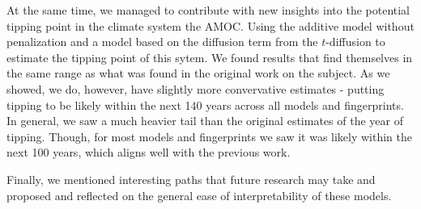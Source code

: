 At the same time, we managed to contribute with new insights into the potential tipping point in the climate system the AMOC. Using the additive model without penalization and a model based on the diffusion term from the $t$-diffusion to estimate the tipping point of this sytem. We found results that find themselves in the same range as what was found in the original work on the subject. As we showed, we do, however, have slightly more convervative estimates - putting tipping to be likely within the next 140 years across all models and fingerprints. In general, we saw a much heavier tail than the original estimates of the year of tipping. Though, for most models and fingerprints we saw it was likely within the next 100 years, which aligns well with the previous work.

Finally, we mentioned interesting paths that future research may take and proposed and reflected on the general ease of interpretability of these models. 